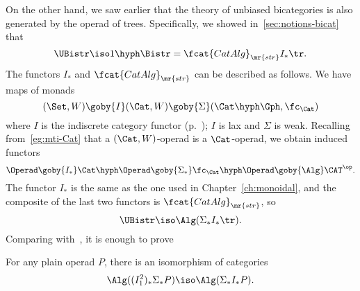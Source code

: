On the other hand, we saw earlier that the theory of unbiased bicategories
is also generated by the operad of trees.  Specifically, we showed
in~\ref{sec:notions-bicat} that
\[
\UBistr 
\iso 
1\hyph\Bistr
=
\fcat{CatAlg}_\mr{str} I_* \tr.%
%
\index{Sigma-bicategory@$\Sigma$-bicategory}%
%
\index{bicategory!Sigma-@$\Sigma$-}
%
\]
The functors $I_*$ and $\fcat{CatAlg}_\mr{str}$ can be described as
follows.  We have maps of monads
\[
(\Set, W)
\goby{I}
(\Cat, W)
\goby{\Sigma}
(\Cat\hyph\Gph, \fc_\Cat)
\]
where $I$ is the indiscrete%
%
%
category functor (p.~\pageref{p:indiscrete});
$I$ is lax and $\Sigma$ is weak.  Recalling from~\ref{eg:mti-Cat} that a
$(\Cat, W)$-operad is a $\Cat$-operad, we obtain induced functors
\[
\Operad 
\goby{I_*} 
\Cat\hyph\Operad
\goby{\Sigma_*}
\fc_\Cat \hyph\Operad
\goby{\Alg}
\CAT^\op.
\]
The functor $I_*$ is the same as the one used in Chapter~\ref{ch:monoidal},
and the composite of the last two functors is $\fcat{CatAlg}_\mr{str}$, so
\[
\UBistr \iso \Alg(\Sigma_* I_* \tr).%
%
\index{tree!operad of|)}
%
\]
Comparing with~, it is enough to prove
% 
\begin{lemma}
For any plain operad $P$, there is an isomorphism of categories
\[
\Alg((I^2_1)_* \Sigma_* P)
\iso
\Alg(\Sigma_* I_* P).
\]
\end{lemma}
% 
